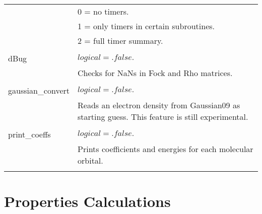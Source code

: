 \begin{Spacing}{1.0}
\begin{longtable}{ p{} p{} }
      &     0 = no timers. \\
      &     1 = only timers in certain subroutines. \\
      &     2 = full timer summary. \\
      \\
      dBug   & $ logical = .false. $\\
      & Checks for NaNs in Fock and Rho matrices.\\
      \\
      gaussian\_convert & $ logical = .false. $ \\
      & Reads an electron density from Gaussian09 as starting guess. 
      This feature is still experimental. \\
      \\
      print\_coeffs   & $ logical = .false. $\\
      & Prints coefficients and energies for each molecular orbital. \\
      \\

   \end{longtable}
\end{Spacing}


\section{Properties Calculations}


